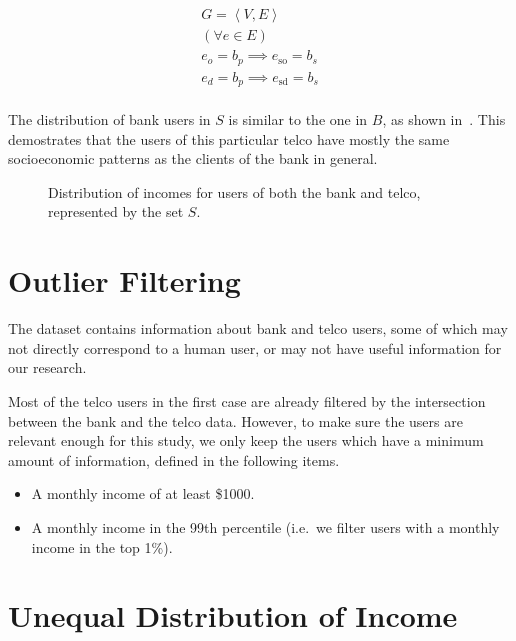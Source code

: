 \begin{equation}
\label{eq:banktelcojoin}
\begin{gathered}
G = \left< V, E \right> \\
( \forall e \in E ) \\
e_o = b_p \implies e_{\operatorname{so}} = b_s \\
e_d = b_p \implies e_{\operatorname{sd}} = b_s \\
\end{gathered}
\end{equation}

The distribution of bank users in $S$ is similar to the one in $B$, as shown in~. This demostrates that the users of this particular telco have mostly the same socioeconomic patterns as the clients of the bank in general.

\begin{figure}
\centering
{}
\caption{Distribution of incomes for users of both the bank and telco, represented by the set $S$.}
\label{fig:matchdistribution}
\end{figure}

\section{Outlier Filtering}
\label{subsec:outlier_filtering}

The dataset contains information about bank and telco users, some of which may not directly correspond to a human user, or may not have useful information for our research.

Most of the telco users in the first case are already filtered by the intersection between the bank and the telco data. However, to make sure the users are relevant enough for this study, we only keep the users which have a minimum amount of information, defined in the following items.

\begin{itemize}
	\item A monthly income of at least \$\num{1000}.
	\item A monthly income in the \num{99}th percentile (i.e.\ we filter users with a monthly income in the top 1\%).
\end{itemize}

\section{Unequal Distribution of Income}

